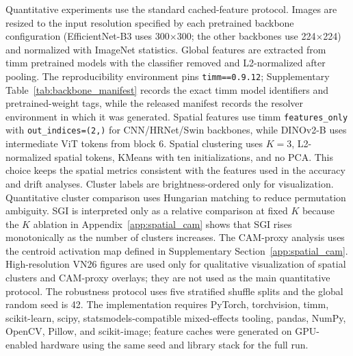\documentclass[a4paper,fleqn]{els-cas-templates/cas-sc}
\begin{document}
Quantitative experiments use the standard cached-feature protocol. Images are resized to the input resolution specified by each pretrained backbone configuration (EfficientNet-B3 uses 300$\times$300; the other backbones use 224$\times$224) and normalized with ImageNet statistics. Global features are extracted from timm pretrained models with the classifier removed and L2-normalized after pooling. The reproducibility environment pins \texttt{timm==0.9.12}; Supplementary Table~\ref{tab:backbone_manifest} records the exact timm model identifiers and pretrained-weight tags, while the released manifest records the resolver environment in which it was generated. Spatial features use timm \texttt{features\_only} with \texttt{out\_indices=(2,)} for CNN/HRNet/Swin backbones, while DINOv2-B uses intermediate ViT tokens from block 6. Spatial clustering uses $K=3$, L2-normalized spatial tokens, KMeans with ten initializations, and no PCA. This choice keeps the spatial metrics consistent with the features used in the accuracy and drift analyses. Cluster labels are brightness-ordered only for visualization. Quantitative cluster comparison uses Hungarian matching to reduce permutation ambiguity. SGI is interpreted only as a relative comparison at fixed $K$ because the $K$ ablation in Appendix~\ref{app:spatial_cam} shows that SGI rises monotonically as the number of clusters increases. The CAM-proxy analysis uses the centroid activation map defined in Supplementary Section~\ref{app:spatial_cam}. High-resolution VN26 figures are used only for qualitative visualization of spatial clusters and CAM-proxy overlays; they are not used as the main quantitative protocol. The robustness protocol uses five stratified shuffle splits and the global random seed is 42. The implementation requires PyTorch, torchvision, timm, scikit-learn, scipy, statsmodels-compatible mixed-effects tooling, pandas, NumPy, OpenCV, Pillow, and scikit-image; feature caches were generated on GPU-enabled hardware using the same seed and library stack for the full run.
\end{document}
